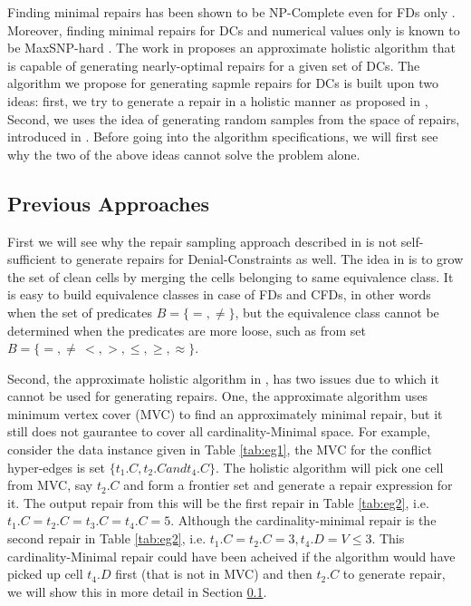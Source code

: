 Finding minimal repairs has been shown to be NP-Complete even for FDs only \cite {Chiang}.
Moreover, finding minimal repairs for DCs and numerical values only is known to be MaxSNP-hard \cite{Bertossi}.
The work in \cite{XuChu} proposes an approximate holistic algorithm that is capable of generating nearly-optimal repairs for a given set of DCs.
The algorithm we propose for generating sapmle repairs for DCs is built upon two ideas: first, we try to generate a repair in a holistic manner as proposed in \cite{XuChu}, Second, we uses the
idea of generating random samples from the space of repairs, introduced in \cite{Beskales_sampling}.
Before going into the algorithm specifications, we will first see why the two of the above ideas cannot solve the problem alone.

\subsection{Previous Approaches}
First we will see why the repair sampling approach described in \cite{Beskales_sampling} is not self-sufficient to generate repairs for Denial-Constraints as well.
The idea in \cite{Beskales_sampling} is to grow the set of clean cells by merging the cells belonging to same equivalence class.
It is easy to build equivalence classes in case of FDs and CFDs, in other words when the set of predicates $B = \{ =, \neq\}$, 
but the equivalence class cannot be determined when the predicates are more loose, such as from set $B = \{ =, \neq\, <, >, \leq, \geq, \approx \}$.

Second, the approximate holistic algorithm in \cite{XuChu}, has two issues due to which it cannot be used for generating repairs.
One, the approximate algorithm uses minimum vertex cover (MVC) to find an approximately minimal repair, but it still does not gaurantee to cover all cardinality-Minimal space.
For example, consider the data instance given in  Table \ref{tab:eg1}, the MVC for the conflict hyper-edges is set $\{t_1.C, t_2.C and t_4.C\}$.
The holistic algorithm will pick one cell from MVC, say $t_2.C$ and form a frontier set and generate a repair expression for it.
The output repair from this will be the first repair in Table \ref{tab:eg2}, i.e. $t_1.C = t_2.C = t_3.C = t_4.C = 5$.
Although the cardinality-minimal repair is the second repair in Table \ref{tab:eg2}, i.e. $t_1.C = t_2.C = 3,t_4.D = V \leq 3$.
This cardinality-Minimal repair could have been acheived if the algorithm would have picked up cell $t_4.D$ first (that is not in MVC) and then $t_2.C$ to generate repair, we will show this in more detail in Section \ref{}.


